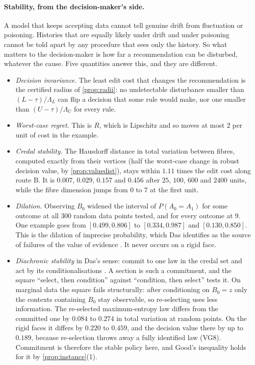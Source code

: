 \documentclass[11pt]{article}
\theoremstyle{definition}\newtheorem{definition}[theorem]{Definition}\newtheorem{remark}[theorem]{Remark}\newtheorem{example}[theorem]{Example}\newtheorem{problem}[theorem]{Open problem}\crefname{problem}{Problem}{Problems}
\begin{document}
\paragraph{Stability, from the decision-maker's side.} A model that keeps accepting data cannot tell genuine drift from fluctuation or poisoning. Histories that are equally likely under drift and under poisoning cannot be told apart by any procedure that sees only the history. So what matters to the decision-maker is how far a recommendation can be disturbed, whatever the cause. Five quantities answer this, and they are different.
\begin{itemize}
\item \emph{Decision invariance.} The least edit cost that changes the recommendation is the certified radius of \cref{prop:radii}: no undetectable disturbance smaller than $(L-\tau)/\Lambda_L$ can flip a decision that some rule would make, nor one smaller than $(U-\tau)/\Lambda_U$ for every rule.
\item \emph{Worst-case regret.} This is $R$, which is Lipschitz and so moves at most $2$ per unit of cost in the example.
\item \emph{Credal stability.} The Hausdorff distance in total variation between fibres, computed exactly from their vertices (half the worst-case change in robust decision value, by \cref{prop:valuedist}), stays within $1.11$ times the edit cost along route B. It is $0.007$, $0.029$, $0.157$ and $0.456$ after $25$, $100$, $600$ and $2400$ units, while the fibre dimension jumps from $0$ to $7$ at the first unit.
\item \emph{Dilation.} Observing $B_0$ widened the interval of $P(A_0=A_1)$ for some outcome at all $300$ random data points tested, and for every outcome at $9$. One example goes from $[0.499,0.806]$ to $[0.334,0.987]$ and $[0.130,0.850]$. This is the dilation of imprecise probability, which Das identifies as the source of failures of the value of evidence \cite{Das2023}. It never occurs on a rigid face.
\item \emph{Diachronic stability} in Das's sense: commit to one law in the credal set and act by its conditionalisations \cite{Das2023}. A section is such a commitment, and the square ``select, then condition'' against ``condition, then select'' tests it. On marginal data the square fails structurally: after conditioning on $B_0=z$ only the contexts containing $B_0$ stay observable, so re-selecting uses less information. The re-selected maximum-entropy law differs from the committed one by $0.084$ to $0.274$ in total variation at random points. On the rigid faces it differs by $0.220$ to $0.459$, and the decision value there by up to $0.189$, because re-selection throws away a fully identified law (VG8). Commitment is therefore the stable policy here, and Good's inequality holds for it by \cref{prop:instance}(1).
\end{itemize}
\end{document}
